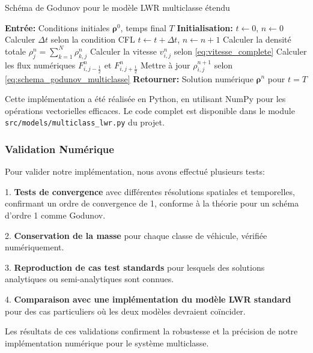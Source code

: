\begin{algorithm}
\caption{Schéma de Godunov pour le modèle LWR multiclasse étendu}
\begin{algorithmic}[1]
\State \textbf{Entrée:} Conditions initiales $\boldsymbol{\rho}^0$, temps final $T$
\State \textbf{Initialisation:} $t \gets 0$, $n \gets 0$
    \State Calculer $\Delta t$ selon la condition CFL
    \State $t \gets t + \Delta t$, $n \gets n + 1$
            \State Calculer la densité totale $\rho_j^n = \sum_{k=1}^N \rho_{k,j}^n$
            \State Calculer la vitesse $v_{i,j}^n$ selon \eqref{eq:vitesse_complete}
            \State Calculer les flux numériques $F_{i,j-\frac{1}{2}}^n$ et $F_{i,j+\frac{1}{2}}^n$
            \State Mettre à jour $\rho_{i,j}^{n+1}$ selon \eqref{eq:schema_godunov_multiclasse}
        \EndFor
    \EndFor
\EndWhile
\State \textbf{Retourner:} Solution numérique $\boldsymbol{\rho}^n$ pour $t = T$
\end{algorithmic}
\end{algorithm}

Cette implémentation a été réalisée en Python, en utilisant NumPy pour les opérations vectorielles efficaces. Le code complet est disponible dans le module \texttt{src/models/multiclass\_lwr.py} du projet.

\subsubsection{Validation Numérique}
\label{subsubsec:validation_numerique}

Pour valider notre implémentation, nous avons effectué plusieurs tests:

1. \textbf{Tests de convergence} avec différentes résolutions spatiales et temporelles, confirmant un ordre de convergence de 1, conforme à la théorie pour un schéma d'ordre 1 comme Godunov.

2. \textbf{Conservation de la masse} pour chaque classe de véhicule, vérifiée numériquement.

3. \textbf{Reproduction de cas test standards} pour lesquels des solutions analytiques ou semi-analytiques sont connues.

4. \textbf{Comparaison avec une implémentation du modèle LWR standard} pour des cas particuliers où les deux modèles devraient coïncider.

Les résultats de ces validations confirment la robustesse et la précision de notre implémentation numérique pour le système multiclasse.

